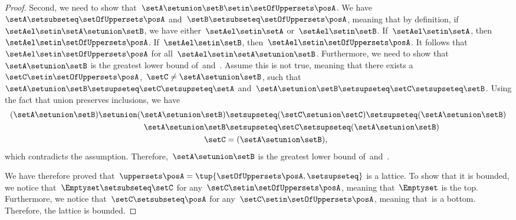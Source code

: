 \begin{proof}
    Second, we need to show that~$\setA\setunion \setB\setin \setOfUppersets \posA$.
    We have~$\setA\setsubseteq \setOfUppersets \posA$ and~$\setB \setsubseteq \setOfUppersets \posA$, meaning that by definition, if~$\setAel\setin \setA\setunion \setB$, we have either~$\setAel\setin \setA$ or~$\setAel\setin \setB$.
    If~$\setAel\setin \setA$, then~$\setAel\setin \setOfUppersets \posA$.
    If~$\setAel\setin \setB$, then~$\setAel \setin \setOfUppersets \posA$.
    It follows that~$\setAel \setin \setOfUppersets \posA$ for all~$\setAel\setin \setA\setunion \setB$.
    Furthermore, we need to show that~$\setA\setunion \setB$ is the greatest lower bound of~\setA and~\setB.
    Assume this is not true, meaning that there exists a~$\setC\setin \setOfUppersets \posA$,~$\setC\neq \setA\setunion \setB$, such that~$\setA\setunion \setB\setsupseteq \setC\setsupseteq \setA$ and~$\setA\setunion \setB\setsupseteq \setC\setsupseteq \setB$.
    Using the fact that union preserves inclusions, we have
    \begin{equation}
        \begin{aligned}
            (\setA\setunion \setB)
            \setunion (\setA\setunion \setB) & \setsupseteq (\setC \setunion \setC) \setsupseteq (\setA\setunion \setB) \\
            \setA\setunion \setB             & \setsupseteq \setC\setsupseteq (\setA\setunion \setB ) \\
            \setC                            & =(\setA\setunion \setB),
        \end{aligned}
    \end{equation}
    which contradicts the assumption.
    Therefore,~$\setA\setunion \setB$ is the greatest lower bound of~\setA and~\setB.

    We have therefore proved that~$\uppersets \posA=\tup{\setOfUppersets \posA,\setsupseteq}$ is a lattice.
    To show that it is bounded, we notice that~$\Emptyset \setsubseteq \setC$ for any~$\setC\setin \setOfUppersets \posA$, meaning that~$\Emptyset$ is the top.
    Furthermore, we notice that~$\setC\setsubseteq \posA$ for any~$\setC\setin \setOfUppersets \posA$, meaning that~\posA is a bottom.
    Therefore, the lattice is bounded.
\end{proof}

